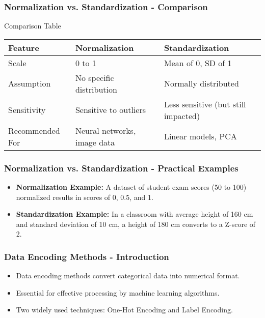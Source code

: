 \documentclass[aspectratio=169]{beamer}
\begin{document}
\begin{frame}[fragile]
    \frametitle{Normalization vs. Standardization - Comparison}
    \begin{block}{Comparison Table}
    \begin{tabular}{|l|l|l|}
        \hline
        \textbf{Feature} & \textbf{Normalization} & \textbf{Standardization} \\
        \hline
        Scale & 0 to 1 & Mean of 0, SD of 1 \\
        \hline
        Assumption & No specific distribution & Normally distributed \\
        \hline
        Sensitivity & Sensitive to outliers & Less sensitive (but still impacted) \\
        \hline
        Recommended For & Neural networks, image data & Linear models, PCA \\
        \hline
    \end{tabular}
    \end{block}
\end{frame}

\begin{frame}[fragile]
    \frametitle{Normalization vs. Standardization - Practical Examples}
    \begin{itemize}
        \item \textbf{Normalization Example:} 
            A dataset of student exam scores (50 to 100) normalized results in scores of 0, 0.5, and 1.
        
        \item \textbf{Standardization Example:} 
            In a classroom with average height of 160 cm and standard deviation of 10 cm, a height of 180 cm converts to a Z-score of 2.
    \end{itemize}
\end{frame}

\begin{frame}[fragile]
    \frametitle{Data Encoding Methods - Introduction}
    \begin{itemize}
        \item Data encoding methods convert categorical data into numerical format.
        \item Essential for effective processing by machine learning algorithms.
        \item Two widely used techniques: One-Hot Encoding and Label Encoding.
    \end{itemize}
\end{frame}
\end{document}
